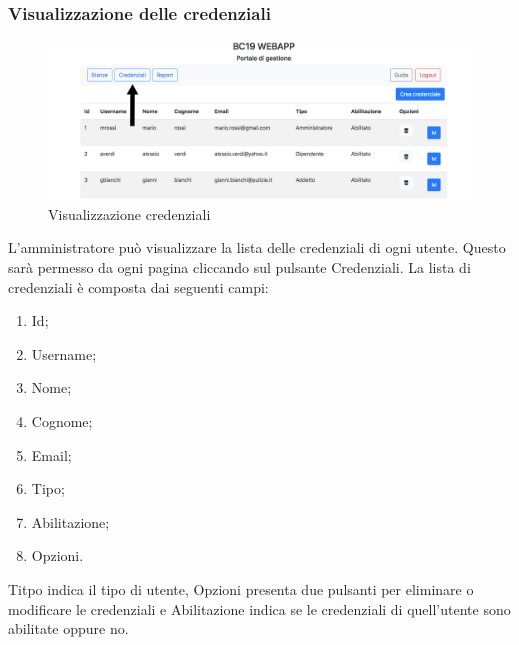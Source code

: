 \subsubsection{Visualizzazione delle credenziali}
\begin{figure}[H]
	\centering
	\includegraphics[width=15cm]{res/images/credential.png}
	\caption{Visualizzazione credenziali}
\end{figure}
L’amministratore può visualizzare la lista delle credenziali di ogni utente. Questo sarà permesso da ogni pagina cliccando sul pulsante Credenziali.
La lista di credenziali è composta dai seguenti campi:
\begin{enumerate}
	\item Id;
	\item Username;
	\item Nome;
	\item Cognome;
	\item Email;
	\item Tipo;
	\item Abilitazione;
	\item Opzioni.
\end{enumerate}
Titpo indica il tipo di utente, Opzioni presenta due pulsanti per eliminare o modificare le credenziali e Abilitazione indica se le credenziali di quell'utente sono abilitate oppure no.


